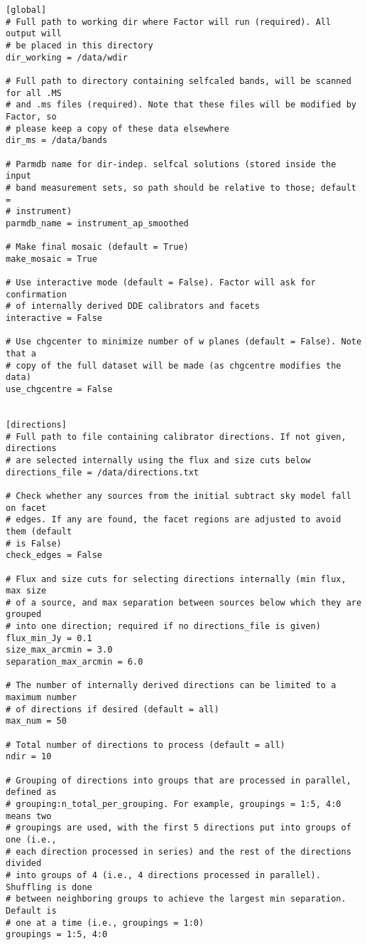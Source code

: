 \documentclass[structabstract]{article}
\begin{document}
\begin{verbatim}
[global]
# Full path to working dir where Factor will run (required). All output will
# be placed in this directory
dir_working = /data/wdir

# Full path to directory containing selfcaled bands, will be scanned for all .MS
# and .ms files (required). Note that these files will be modified by Factor, so
# please keep a copy of these data elsewhere
dir_ms = /data/bands

# Parmdb name for dir-indep. selfcal solutions (stored inside the input
# band measurement sets, so path should be relative to those; default =
# instrument)
parmdb_name = instrument_ap_smoothed

# Make final mosaic (default = True)
make_mosaic = True

# Use interactive mode (default = False). Factor will ask for confirmation
# of internally derived DDE calibrators and facets
interactive = False

# Use chgcenter to minimize number of w planes (default = False). Note that a
# copy of the full dataset will be made (as chgcentre modifies the data)
use_chgcentre = False


[directions]
# Full path to file containing calibrator directions. If not given, directions
# are selected internally using the flux and size cuts below
directions_file = /data/directions.txt

# Check whether any sources from the initial subtract sky model fall on facet
# edges. If any are found, the facet regions are adjusted to avoid them (default
# is False)
check_edges = False

# Flux and size cuts for selecting directions internally (min flux, max size
# of a source, and max separation between sources below which they are grouped
# into one direction; required if no directions_file is given)
flux_min_Jy = 0.1
size_max_arcmin = 3.0
separation_max_arcmin = 6.0

# The number of internally derived directions can be limited to a maximum number
# of directions if desired (default = all)
max_num = 50

# Total number of directions to process (default = all)
ndir = 10

# Grouping of directions into groups that are processed in parallel, defined as
# grouping:n_total_per_grouping. For example, groupings = 1:5, 4:0 means two
# groupings are used, with the first 5 directions put into groups of one (i.e.,
# each direction processed in series) and the rest of the directions divided
# into groups of 4 (i.e., 4 directions processed in parallel). Shuffling is done
# between neighboring groups to achieve the largest min separation. Default is
# one at a time (i.e., groupings = 1:0)
groupings = 1:5, 4:0


\end{verbatim}
\end{document}
